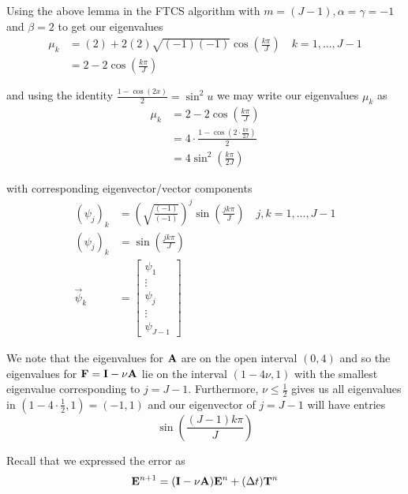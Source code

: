 \documentclass[12pt]{article}
\newlength\tindent
\renewcommand{\indent}{\hspace*{\tindent}}
\begin{document}
\indent Using the above lemma in the FTCS algorithm with $m = (J - 1), \alpha = \gamma = -1$ and $\beta  = 2$ to get our eigenvalues
\begin{align*}
	\mu_k &= (2) + 2(2)\sqrt{(-1)(-1)} \cos \left( \frac{ k\pi }{ J } \right) \quad k = 1, ..., J - 1\\
	&= 2 - 2\cos\left( \frac{k\pi}{J} \right)
\end{align*}

and using the identity $\frac{1 - \cos (2x)}{ 2 } = \sin^2 u$ we may write our eigenvalues $\mu_k$ as
\begin{align*}
	\mu_k &= 2 - 2\cos\left( \frac{k\pi}{J} \right) \\
	&= 4 \cdot \frac{1 - \cos\left( 2 \cdot \frac{ k\pi }{ 2J } \right)}{ 2 } \\
	&= 4\sin^2 \left( \frac{k\pi}{2J} \right) 
\end{align*}

with corresponding eigenvector/vector components
\begin{align*}
	(\psi_j)_k &= \left( \sqrt{ \frac{(-1)}{(-1)} }\right)^j \sin\left( \frac{jk\pi}{J} \right) \quad j, k = 1, ... , J - 1 \\
	(\psi_j)_k &= \sin\left( \frac{jk\pi}{J} \right) \\
	\vec{\psi}_k &= 
	\begin{bmatrix}
		\psi_1 \\
		\vdots \\
		\psi_j \\
		\vdots \\
		\psi_{J - 1}
	\end{bmatrix}
\end{align*}

\indent We note that the eigenvalues for ${\bf A}$ are on the open interval $(0, 4)$ and so the eigenvalues for ${\bf F} = {\bf I} - \nu{\bf A}$ lie on the interval $(1 - 4\nu, 1)$ with the smallest eigenvalue corresponding to $j = J - 1$. Furthermore, $\nu \leq \frac{1}{2}$ gives us all eigenvalues in $(1 - 4\cdot\frac{1}{2}, 1) = (-1, 1)$ and our eigenvector of $j = J - 1$ will have entries
\begin{equation*}
	\sin \left( \frac{(J - 1)k\pi}{J} \right)
\end{equation*}

Recall that we expressed the error as
\begin{equation*}
	{\bf E}^{n + 1} = ({\bf I} - \nu{\bf A}){\bf E}^n + (\Delta t){\bf T}^n
\end{equation*}
\end{document}
